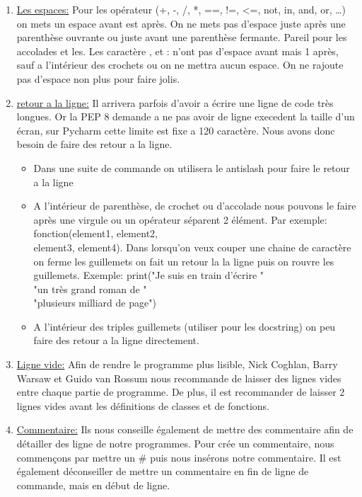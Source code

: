 \begin{enumerate}
	\label{PEP8:point4} \item \underline{Les espaces:} Pour les opérateur (+, -, /, *, ==, !=, <=, not, in, and, or, \dots) on mets un espace avant est après. On ne mets pas d'espace juste après une parenthèse ouvrante ou juste avant une parenthèse fermante. Pareil pour les accolades et les. Les caractère , et : n'ont pas d'espace avant mais 1 après, sauf a l'intérieur des crochets ou on ne mettra aucun espace. On ne rajoute pas d'espace non plus pour faire jolis.
	
	\label{PEP8:point5} \item \underline{retour a la ligne:} Il arrivera parfois d'avoir a écrire une ligne de code très longues. Or la PEP 8 demande a ne pas avoir de ligne execedent la taille d'un écran, sur Pycharm cette limite est fixe a 120 caractère. Nous avons donc besoin de faire des retour a la ligne.
	
	\begin{itemize}[label=\textbullet]
	
		\item Dans une suite de commande on utilisera le antislash pour faire le retour a la ligne

		\item A l'intérieur de parenthèse, de crochet ou d'accolade nous pouvons le faire après une virgule ou un opérateur séparent 2 élément. Par exemple: fonction(element1, element2, \\ element3, element4).
		Dans lorsqu'on veux couper une chaine de caractère on ferme les guillemets on fait un retour la la ligne puis on rouvre les guillemets. Exemple: print("Je suis en train d'écrire " \\ "un très grand roman de " \\  "plusieurs milliard de page")
		
		\item A l'intérieur des triples guillemets (utiliser pour les docstring) on peu faire des retour a la ligne directement.	
		
	\end{itemize}
		
	\label{PEP8:point6} \item \underline{Ligne vide:}	 Afin de rendre le programme plus lisible, Nick Coghlan, Barry Warsaw et Guido van Rossum nous recommande de laisser des lignes vides entre chaque partie de programme. De plus, il est recommander de laisser 2 lignes vides avant les définitions de classes et de fonctions.
	
	\label{PEP8:point7} \item \underline{Commentaire:} Ils nous conseille également de mettre des commentaire afin de détailler des ligne de notre programmes. Pour crée un commentaire, nous commençons par mettre un \# puis nous insérons notre commentaire. Il est également déconseiller de mettre un commentaire en fin de ligne de commande, mais en début de ligne.
	

\end{enumerate}
